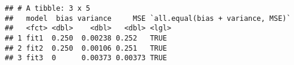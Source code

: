 \begin{Shaded}
\end{Shaded}

\begin{verbatim}
## # A tibble: 3 x 5
##   model  bias variance     MSE `all.equal(bias + variance, MSE)`
##   <fct> <dbl>    <dbl>   <dbl> <lgl>                            
## 1 fit1  0.250  0.00238 0.252   TRUE                             
## 2 fit2  0.250  0.00106 0.251   TRUE                             
## 3 fit3  0      0.00373 0.00373 TRUE
\end{verbatim}


